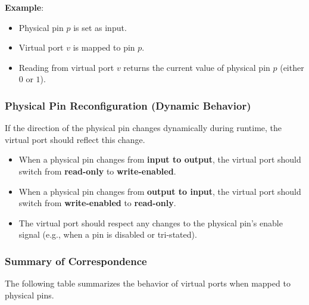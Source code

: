 \textbf{Example}:
\begin{itemize}[noitemsep]
    \item Physical pin $p$ is set as input.
    \item Virtual port $v$ is mapped to pin $p$.
    \item Reading from virtual port $v$ returns the current value of physical pin $p$ (either $0$ or $1$).
\end{itemize}

\subsubsection{Physical Pin Reconfiguration (Dynamic Behavior)}
If the direction of the physical pin changes dynamically during runtime, the virtual port should reflect this change.

\begin{itemize}[noitemsep]
    \item When a physical pin changes from \textbf{input to output}, the virtual port should switch from \textbf{read-only} to \textbf{write-enabled}.
    \item When a physical pin changes from \textbf{output to input}, the virtual port should switch from \textbf{write-enabled} to \textbf{read-only}.
    \item The virtual port should respect any changes to the physical pin's enable signal (e.g., when a pin is disabled or tri-stated).
\end{itemize}

\subsubsection{Summary of Correspondence}
The following table summarizes the behavior of virtual ports when mapped to physical pins.
\begin{table}[ht]
    \centering
    \caption{Virtual Port Behavior Correspondence with Physical Pins}
\end{table}

